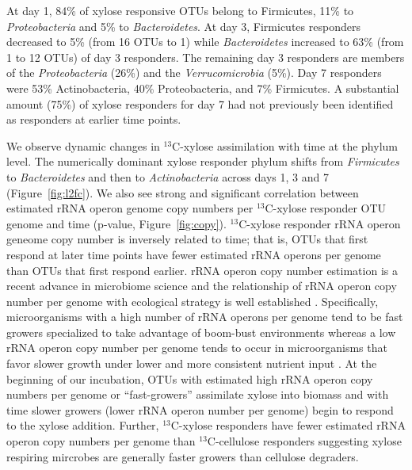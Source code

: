 At day 1, 84\% of xylose responsive OTUs belong to Firmicutes, 11\% to
\textit{Proteobacteria} and 5\% to \textit{Bacteroidetes}. At day 3,
Firmicutes responders decreased to 5\% (from 16 OTUs to 1) while
\textit{Bacteroidetes} increased to 63\% (from 1 to 12 OTUs) of day 3
responders. The remaining day 3 responders are members of the
\textit{Proteobacteria} (26\%) and the \textit{Verrucomicrobia} (5\%). Day 7
responders were 53\% Actinobacteria, 40\% Proteobacteria, and 7\% Firmicutes. A
substantial amount (75\%) of xylose responders for day 7 had not previously
been identified as responders at earlier time points. 

We observe dynamic changes in $^{13}$C-xylose assimilation with time at the
phylum level. The numerically dominant xylose responder phylum shifts from
\textit{Firmicutes} to \textit{Bacteroidetes} and then to \textit{Actinobacteria}
across days 1, 3 and 7 (Figure~\ref{fig:l2fc}). We also see strong and significant
correlation between estimated rRNA operon genome copy numbers per $^{13}$C-xylose
responder OTU genome and time (p-value, Figure~\ref{fig:copy}). $^{13}$C-xylose responder
rRNA operon geneome copy number is inversely related to time; that is, OTUs
that first respond at later time points have fewer estimated rRNA operons per
genome than OTUs that first respond earlier. rRNA operon copy number estimation
is a recent advance in microbiome science \citep{Kembel_2012} and the relationship of rRNA
operon copy number per genome with ecological strategy is well established
\citep{Klappenbach_2000}. Specifically, microorganisms with a high number of rRNA operons per
genome tend to be fast growers specialized to take advantage of boom-bust
environments whereas a low rRNA operon copy number per genome tends to occur in
microorganisms that favor slower growth under lower and more consistent
nutrient input \citep{Klappenbach_2000}. At the beginning of our incubation, OTUs with estimated
high rRNA operon copy numbers per genome or ``fast-growers'' assimilate xylose
into biomass and with time slower growers (lower rRNA operon number per genome)
begin to respond to the xylose addition. Further, $^{13}$C-xylose responders
have fewer estimated rRNA operon copy numbers per genome than
$^{13}$C-cellulose responders suggesting xylose respiring mircrobes are
generally faster growers than cellulose degraders.

